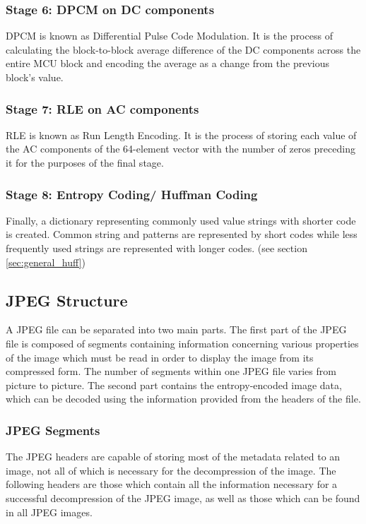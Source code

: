 \subsubsection{Stage 6: DPCM on DC components}
DPCM is known as Differential Pulse
Code Modulation. It is the process of
calculating the block-to-block average difference
of the DC components across the entire MCU block
and encoding the average as a change from the 
previous block's value.\cite{hass_impulse_jpeg}

\subsubsection{Stage 7: RLE on AC components}
RLE is known as Run Length Encoding. It is the process of
storing each value of the AC components of the
64-element vector with the number of zeros
preceding it for the purposes of the final stage.\cite{hass_impulse_jpeg}

\subsubsection{Stage 8: Entropy Coding/ Huffman Coding}
Finally, a dictionary representing commonly used value strings with
shorter code is created. Common string and patterns
are represented by short codes while less frequently
used strings are represented with longer codes.
(see section \ref{sec:general_huff})

\subsection{JPEG Structure}
A JPEG file can be separated into two main parts. 
The first part of the JPEG file is composed of segments containing information concerning 
various properties of the image which must be read in order to display the image from its compressed form. 
The number of segments within one JPEG file varies from picture to picture.
The second part contains the entropy-encoded image data, which can be decoded using the information provided from the headers of the file.  

\subsubsection{JPEG Segments}
The JPEG headers are capable of storing most of the metadata related to an image, not all of which is necessary for the decompression of the image. 
The following headers are those which contain all the information necessary for 
a successful decompression of the JPEG image, as well as those which can be found in all JPEG images.

